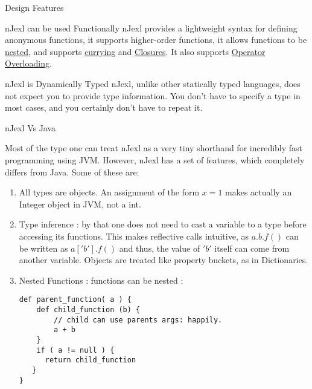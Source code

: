 \begin{section}{Design Features}
\begin{subsection}{nJexl can be used Functionally}
nJexl provides a lightweight syntax for defining anonymous functions, it supports higher-order functions, it allows functions to be 
\href{https://en.wikipedia.org/wiki/Nested_function}{nested}, and supports \href{https://en.wikipedia.org/wiki/Currying}{currying} and \href{https://en.wikipedia.org/wiki/Closure_(computer_programming)}{Closures}. 
It also supports \href{https://en.wikipedia.org/wiki/Operator_overloading}{Operator Overloading}. 

\end{subsection}

\begin{subsection}{nJexl is Dynamically Typed}
nJexl, unlike other statically typed languages, does not expect you to provide type information. 
You don't have to specify a type in most cases, and you certainly don't have to repeat it.

\end{subsection}

\begin{subsection}{nJexl Vs Java}

Most of the type one can treat nJexl as a very tiny shorthand for incredibly fast programming using JVM.
However, nJexl has a set of features, which completely differs from Java. Some of these are:

\begin{enumerate}

\item{ All types are objects. An assignment of the form $x = 1 $ makes actually an Integer object in JVM, not a int. }

\item { Type inference :  by that one does not need to cast a variable to a type before accessing its functions. 
    This makes reflective calls intuitive, as $ a.b.f() $ can be written as $ a['b'].f() $ and thus, the value of $'b'$
    itself can come from another variable. Objects are treated like property buckets, as in Dictionaries.  
}

\item { Nested Functions : functions can be nested :

\begin{center}\begin{minipage}{\linewidth}
\begin{lstlisting}[style=JexlStyle]
def parent_function( a ) {
    def child_function (b) {
        // child can use parents args: happily.
    	a + b 
    }
    if ( a != null ) {
      return child_function 
   }
}
\end{lstlisting}
\end{minipage}\end{center}

}
\end{enumerate}
\end{subsection}
\end{section}
